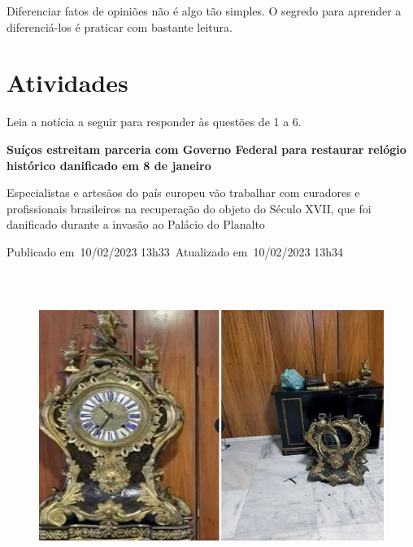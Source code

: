 \begin{itemize}
\begin{itemize}
{Diferenciar fatos de opiniões não é algo tão simples. O segredo para
aprender a diferenciá-los é praticar com bastante leitura.
}

\section{Atividades}

Leia a notícia a seguir para responder às questões de 1 a 6.


\textbf{Suíços estreitam parceria com Governo Federal para restaurar
relógio histórico danificado em 8 de janeiro}

Especialistas e artesãos do país europeu vão trabalhar com curadores e
profissionais brasileiros na recuperação do objeto do Século XVII, que
foi danificado durante a invasão ao Palácio do Planalto

Publicado em~10/02/2023 13h33~Atualizado em~10/02/2023 13h34

\begin{figure}
\centering
\includegraphics[width=5.90556in,height=3.93681in]{./_SAEB_9_POR/media/image8.jpeg}
\caption{}
\end{figure}


\end{itemize}
\end{itemize}
